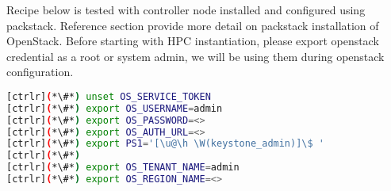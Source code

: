 Recipe below is tested with controller node installed and configured using packstack.
Reference section provide more detail on packstack installation of OpenStack.
Before starting with HPC instantiation, please export openstack credential as a root or system admin, we will be using them during openstack configuration. 

\begin{lstlisting}[language=bash,keywords={}]
[ctrlr](*\#*) unset OS_SERVICE_TOKEN
[ctrlr](*\#*) export OS_USERNAME=admin
[ctrlr](*\#*) export OS_PASSWORD=<>
[ctrlr](*\#*) export OS_AUTH_URL=<>
[ctrlr](*\#*) export PS1='[\u@\h \W(keystone_admin)]\$ '
[ctrlr](*\#*) 
[ctrlr](*\#*) export OS_TENANT_NAME=admin
[ctrlr](*\#*) export OS_REGION_NAME=<>  
\end{lstlisting}
